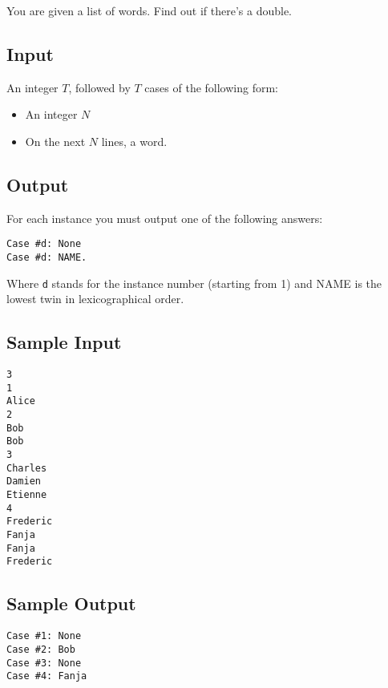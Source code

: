 

You are given a list of words. Find out if there's a double.

\subsection*{Input}

An integer $T$, followed by $T$ cases of the following form:
\begin{itemize}
\item An integer $N$
\item On the next $N$ lines, a word.
\end{itemize}

\subsection*{Output}

For each instance you must output one of the following answers:

\begin{verbatim}
Case #d: None
Case #d: NAME.
\end{verbatim}

Where \texttt{d} stands for the instance number (starting from 1) and NAME is the lowest twin in lexicographical order.

\subsection*{Sample Input}

\begin{verbatim}
3
1
Alice
2
Bob
Bob
3
Charles
Damien
Etienne
4
Frederic
Fanja
Fanja
Frederic
\end{verbatim}

\subsection*{Sample Output}

\begin{verbatim}
Case #1: None
Case #2: Bob
Case #3: None
Case #4: Fanja
\end{verbatim}
